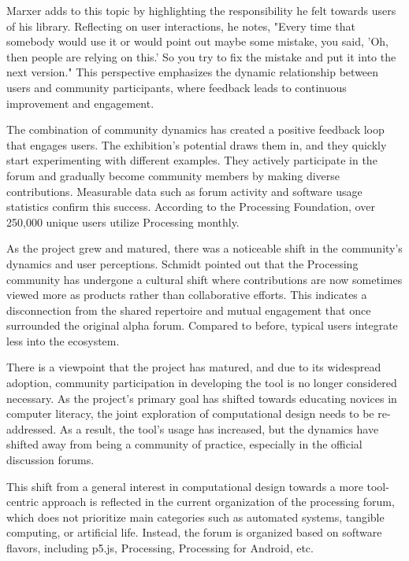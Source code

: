 Marxer adds to this topic by highlighting the responsibility he felt towards users of his library. Reflecting on user interactions, he notes, "Every time that somebody would use it or would point out maybe some mistake, you said, 'Oh, then people are relying on this.' So you try to fix the mistake and put it into the next version." This perspective emphasizes the dynamic relationship between users and community participants, where feedback leads to continuous improvement and engagement.

The combination of community dynamics has created a positive feedback loop that engages users. The exhibition's potential draws them in, and they quickly start experimenting with different examples. They actively participate in the forum and gradually become community members by making diverse contributions. Measurable data such as forum activity and software usage statistics confirm this success. According to the Processing Foundation, over 250,000 unique users utilize Processing monthly.

As the project grew and matured, there was a noticeable shift in the community's dynamics and user perceptions. Schmidt pointed out that the Processing community has undergone a cultural shift where contributions are now sometimes viewed more as products rather than collaborative efforts. This indicates a disconnection from the shared repertoire and mutual engagement that once surrounded the original alpha forum. Compared to before, typical users integrate less into the ecosystem.

There is a viewpoint that the project has matured, and due to its widespread adoption, community participation in developing the tool is no longer considered necessary. As the project's primary goal has shifted towards educating novices in computer literacy, the joint exploration of computational design needs to be re-addressed. As a result, the tool's usage has increased, but the dynamics have shifted away from being a community of practice, especially in the official discussion forums.



This shift from a general interest in computational design towards a more tool-centric approach is reflected in the current organization of the processing forum, which does not prioritize main categories such as automated systems, tangible computing, or artificial life. Instead, the forum is organized based on software flavors, including p5.js, Processing, Processing for Android, etc.


